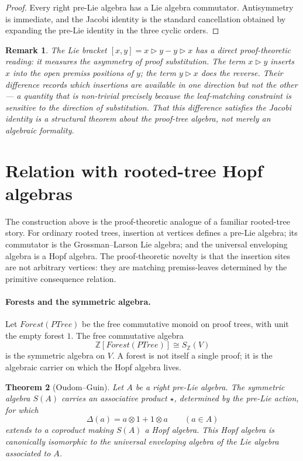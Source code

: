 \documentclass[11pt]{article}
\newtheorem{theorem}{Theorem}
\newtheorem{remark}[theorem]{Remark}
\newcommand{\PTree}{\mathit{PTree}}
\newcommand{\Forest}{\mathit{Forest}}
\newcommand{\ZZ}{\mathbb{Z}}
\begin{document}
\begin{proof}
Every right pre-Lie algebra has a Lie algebra commutator.  Antisymmetry is
immediate, and the Jacobi identity is the standard cancellation obtained by
expanding the pre-Lie identity in the three cyclic orders.
\end{proof}

\begin{remark}
The Lie bracket \([x,y]=x\triangleright y-y\triangleright x\) has a
direct proof-theoretic reading: it measures the \emph{asymmetry of proof
substitution}.  The term \(x\triangleright y\) inserts \(x\) into the open
premiss positions of \(y\); the term \(y\triangleright x\) does the reverse.
Their difference records which insertions are available in one direction
but not the other --- a quantity that is non-trivial precisely because
the leaf-matching constraint is sensitive to the direction of substitution.
That this difference satisfies the Jacobi identity is a structural theorem
about the proof-tree algebra, not merely an algebraic formality.
\end{remark}

\section{Relation with rooted-tree Hopf algebras}

The construction above is the proof-theoretic analogue of a familiar
rooted-tree story.  For ordinary rooted trees, insertion at vertices defines a
pre-Lie algebra; its commutator is the Grossman--Larson Lie algebra; and the
universal enveloping algebra is a Hopf algebra.  The proof-theoretic novelty is
that the insertion sites are not arbitrary vertices: they are matching
premiss-leaves determined by the primitive consequence relation.

\paragraph{Forests and the symmetric algebra.}
Let \(\Forest(\PTree)\) be the free commutative monoid on proof trees, with
unit the empty forest \(1\).  The free commutative algebra
\[
\ZZ[\Forest(\PTree)]\cong S_{\ZZ}(V)
\]
is the symmetric algebra on \(V\).  A forest is not itself a single proof; it
is the algebraic carrier on which the Hopf algebra lives.

\begin{theorem}[Oudom--Guin]
Let \(A\) be a right pre-Lie algebra.  The symmetric algebra \(S(A)\) carries
an associative product \(\star\), determined by the pre-Lie action, for which
\[
\Delta(a)=a\otimes 1+1\otimes a\qquad(a\in A)
\]
extends to a coproduct making \(S(A)\) a Hopf algebra.  This Hopf algebra is
canonically isomorphic to the universal enveloping algebra of the Lie algebra
associated to \(A\).
\end{theorem}
\end{document}
